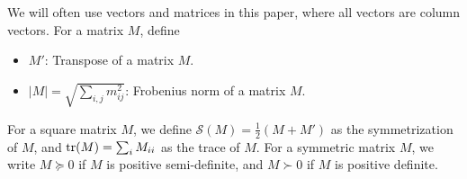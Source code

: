 \documentclass[final]{siamltex}
\begin{document}
\iffalse
\begin{itemize}

  \item [] $\mathbb S^l$: the set of symmetric $l \times l$ real matrices.
  \item []  $L^2_{{\mathcal G}}(\Omega; \, {\mathbb{R}}^l)$: the set of random variables $\xi: (\Omega, {{\mathcal G}}) \rightarrow ({\mathbb{R}}^l, {\cal B}({\mathbb{R}}^l))$ with ${\mathbb{E}\left[{|\xi|^2}\right]}<+\infty$.
  \item [] $L^\infty_{{\mathcal G}}(\Omega; \, {\mathbb{R}}^l)$: the set of essentially bounded  random variables $\xi: (\Omega, {{\mathcal G}}) \rightarrow ({\mathbb{R}}^l, {\cal B}({\mathbb{R}}^l))$.
  \item [] $L^2_{{\mathcal G}}(t, \, T; \, {\mathbb{R}}^l)$: the set of $\{{{\mathcal G}}_s\}_{s\in [t,T]}$-adapted processes $f=\{f_s: t\leq s\leq T\}$ with ${\mathbb{E}\left[{ \int_t^T|f_s|^2\, ds}\right]} < \infty$.
  \item [] $L^\infty_{{\mathcal G}}(t, \, T; \, {\mathbb{R}}^l)$: the set of essentially  bounded $\{{{\mathcal G}}_s\}_{s\in [t,T]}$-adapted processes.
   \item [] $L^2_{{\mathcal G}}(\Omega; \, C(t, \, T; \, {\mathbb{R}}^l))$: the set of continuous $
\{{{\mathcal G}}_t\}_{s\in [t,T]}$-adapted processes $f=\{f_s: t\leq s\leq T\}$ with ${\mathbb{E}\left[{ \sup_{s\in [t,T]}|f_s|^2\, }\right]} < \infty$.
\end{itemize}
\fi

We will often use vectors and matrices in this paper, where all vectors are column vectors. For a matrix $M$,
 define
\begin{itemize}
  \item [] $M'$: Transpose of a matrix $M$.
  \item [] $|M|=\sqrt{\sum_{i,j}m_{ij}^2}$: Frobenius norm of a matrix $M$.
\end{itemize}
For a square matrix $M$, we define
 ${{\mathcal S}}(M)=\frac{1}{2}(M+M')$ as the symmetrization of  $M$, and ${{\rm tr}}(M)=\sum_i M_{ii}$ as the trace of $M$.
 For a symmetric matrix $M$, we write $M\succeq 0$ if $M$ is positive semi-definite, and $M\succ 0$ if $M$ is
 positive definite.

\medskip
\end{document}
